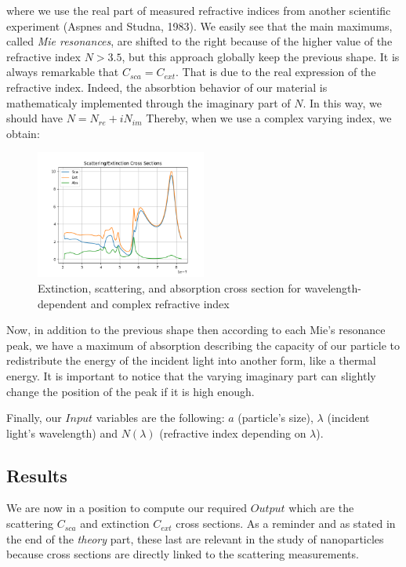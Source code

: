 \documentclass{article}
\numberwithin{equation}{section}
\begin{document}
where we use the real part of measured refractive indices from another scientific experiment (Aspnes and Studna, 1983). We easily see that the main maximums, called \textit{Mie resonances}, are shifted to the right because of the higher value of the refractive index $N>3.5$, but this approach globally keep the previous shape. It is always remarkable that $C_{sca}=C_{ext}$. That is due to the real expression of the refractive index. Indeed, the absorbtion behavior of our material is mathematicaly implemented through the imaginary part of $N$. In this way, we should have $N=N_{re}+iN_{im}$ Thereby, when we use a complex varying index, we obtain:
\begin{figure}[h!]
    \centering
    \includegraphics[width=0.5\textwidth, height=0.4\textwidth]{ri_var_complex.png}
    \caption{Extinction, scattering, and absorption cross section for wavelength-dependent and complex refractive index}
\end{figure}
Now, in addition to the previous shape then according to each Mie's resonance peak, we have a maximum of absorption describing the capacity of our particle to redistribute the energy of the incident light into another form, like a thermal energy. It is important to notice that the varying imaginary part can slightly change the position of the peak if it is high enough.

Finally, our $Input$ variables are the following: $a$ (particle's size), $\lambda$ (incident light's wavelength) and $N(\lambda)$ (refractive index depending on $\lambda$).

\subsection{Results}

We are now in a position to compute our required $Output$ which are the scattering $C_{sca}$ and extinction $C_{ext}$ cross sections. As a reminder and as stated in the end of the \textit{theory} part, these last are relevant in the study of nanoparticles because cross sections are directly linked to the scattering measurements.
\end{document}
